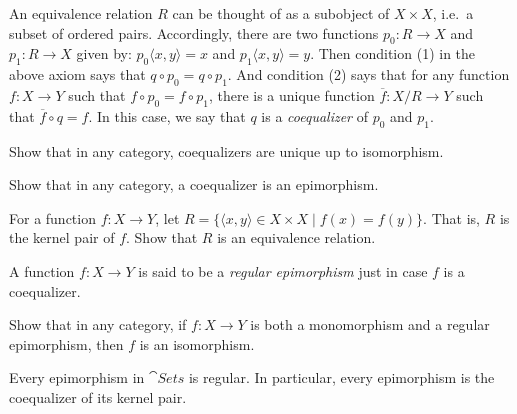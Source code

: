 An equivalence relation $R$ can be thought of as a subobject of
$X\times X$, i.e.\ a subset of ordered pairs.  Accordingly, there are
two functions $p_0:R\to X$ and $p_1:R\to X$ given by: $p_0\langle
x,y\rangle = x$ and $p_1\langle x,y\rangle =y$.  Then condition (1) in
the above axiom says that $q\circ p_0=q\circ p_1$.  And condition (2)
says that for any function $f:X\to Y$ such that $f\circ p_0=f\circ p
_1$, there is a unique function $\overline{f}:X/R \to Y$ such that
$\overline{f}\circ q=f$.  In this case, we say that $q$ is a
\emph{coequalizer} of $p_0$ and $p_1$.

\begin{exercise} Show that in any category, coequalizers are unique up
  to isomorphism. \end{exercise}

\begin{exercise} Show that in any category, a coequalizer is an
  epimorphism. \end{exercise}

\begin{exercise} For a function $f:X\to Y$, let $R=\{ \langle
  x,y\rangle \in X\times X \mid f(x)=f(y) \}$.  That is, $R$ is the
  kernel pair of $f$.  Show that $R$ is an equivalence
  relation. \end{exercise}

\begin{defn} A function $f:X\to Y$ is said to be a \emph{regular
    epimorphism} just in case $f$ is a coequalizer. \end{defn}

\begin{exercise} Show that in any category, if $f:X\to Y$ is both a
  monomorphism and a regular epimorphism, then $f$ is an
  isomorphism. \end{exercise}

\begin{prop} Every epimorphism in $\cat{Sets}$ is regular.  In
  particular, every epimorphism is the coequalizer of its kernel
  pair. \label{regs} \end{prop}

